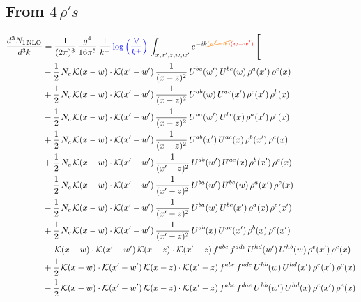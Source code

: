 \documentclass[9pt]{article}
\numberwithin{equation}{section}
\begin{document}
\subsection{From $4\, \rho's$}
\begin{align}
\frac{d^{3}N_{1\,\mathrm{NLO}}}{d^{3}k} & = \frac{1}{(2\pi)^{3}}\,\frac{g^{4}}{16\pi^{5}}\,\frac{1}{k^{+}}\,{\color{blue}\log{\left(\frac{\vee}{k^{+}}\right)}}\,\int_{x,x',z,w,w'}e^{-ik{\color{orange}\cancel{(w'-w)}}{\color{red}(w-w')}}\,\Bigg[\notag\\ & -\frac{1}{2}\,N_{c}\,\mathcal{K}(x-w)\cdot\mathcal{K}(x'-w')\,\frac{1}{(x-z)^{2}}\,U^{ba}(w')\,U^{bc}(w)\,\rho^{a}(x')\,\rho^{c}(x)\notag\\
& +\frac{1}{2}\,N_{c}\,\mathcal{K}(x-w)\cdot\mathcal{K}(x'-w')\,\frac{1}{(x-z)^{2}}\,U^{ab}(w)\,U^{ac}(x')\,\rho^{c}(x')\,\rho^{b}(x)\notag\\
& -\frac{1}{2}\,N_{c}\,\mathcal{K}(x-w)\cdot\mathcal{K}(x'-w')\,\frac{1}{(x-z)^{2}}\,U^{ba}(w')\,U^{bc}(x)\,\rho^{a}(x')\,\rho^{c}(x)\notag\\
& +\frac{1}{2}\,N_{c}\,\mathcal{K}(x-w)\cdot\mathcal{K}(x'-w')\,\frac{1}{(x-z)^{2}}\,U^{ab}(x')\,U^{ac}(x)\,\rho^{b}(x')\,\rho^{c}(x)\notag\\
& +\frac{1}{2}\,N_{c}\,\mathcal{K}(x-w)\cdot\mathcal{K}(x'-w')\,\frac{1}{(x'-z)^{2}}\,U^{ab}(w')\,U^{ac}(x)\,\rho^{b}(x')\,\rho^{c}(x)\notag\\
& -\frac{1}{2}\,N_{c}\,\mathcal{K}(x-w)\cdot\mathcal{K}(x'-w')\,\frac{1}{(x'-z)^{2}}\,U^{ba}(w')\,U^{bc}(w)\,\rho^{a}(x')\,\rho^{c}(x)\notag\\
& -\frac{1}{2}\,N_{c}\,\mathcal{K}(x-w)\cdot\mathcal{K}(x'-w')\,\frac{1}{(x'-z)^{2}}\,U^{ba}(w)\,U^{bc}(x')\,\rho^{a}(x)\,\rho^{c}(x')\notag\\
& +\frac{1}{2}\,N_{c}\,\mathcal{K}(x-w)\cdot\mathcal{K}(x'-w')\,\frac{1}{(x'-z)^{2}}\,U^{ab}(x)\,U^{ac}(x')\,\rho^{b}(x)\,\rho^{c}(x')\notag\\
& -\,\mathcal{K}(x-w)\cdot\mathcal{K}(x'-w')\,\mathcal{K}(x-z)\cdot\mathcal{K}(x'-z)\,f^{abc}\,f^{ade}\,U^{hd}(w')\,U^{hb}(w)\,\rho^{e}(x')\,\rho^{c}(x)\notag\\
& +\frac{1}{2}\,\mathcal{K}(x-w)\cdot\mathcal{K}(x'-w')\,\mathcal{K}(x-z)\cdot\mathcal{K}(x'-z)\,f^{abc}\,f^{ade}\,U^{hb}(w)\,U^{hd}(x')\,\rho^{e}(x')\,\rho^{c}(x)\notag\\
& -\frac{1}{2}\,\mathcal{K}(x-w)\cdot\mathcal{K}(x'-w')\,\mathcal{K}(x-z)\cdot\mathcal{K}(x'-z)\,f^{abc}\,f^{dae}\,U^{hb}(w')\,U^{hd}(x)\,\rho^{c}(x')\,\rho^{e}(x)\notag\\

\end{align}
\end{document}
